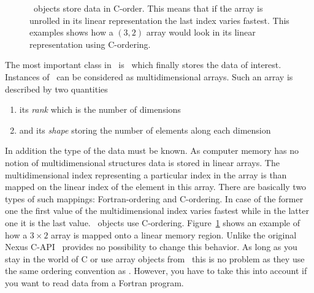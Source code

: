 \begin{figure}[tb]
\centering
\begin{minipage}[c]{0.3\linewidth}
\centering
{}
\end{minipage}
\hfill
\begin{minipage}[c]{0.68\linewidth}
\caption{{\small\label{fig:c_order}
\nxfield\ objects store data in C-order. This means that if the array is
unrolled in its linear representation the last index varies fastest. 
This examples shows how a $(3,2)$ array would look in its linear representation
using C-ordering.  }}
\end{minipage}
\end{figure}
The most important class in \pninx\ is \nxfield\ which finally stores the data
of interest. Instances of \nxfield\ can be considered as multidimensional
arrays. Such an array is described by two quantities
\begin{enumerate}
\item its {\em rank} which is the number of dimensions
\item and its {\em shape} storing the number of elements along each
dimension
\end{enumerate}
In addition the type of the data must be known. As computer memory has no notion
of multidimensional structures data is stored in linear arrays. The
multidimensional index representing a particular index in the array is than
mapped on the linear index of the element in this array. There are basically two
types of such mappings: Fortran-ordering and C-ordering. In case of the former
one the first value of the multidimensional index varies fastest while in the
latter one it is the last value. \nxfield\ objects use C-ordering. 
Figure~\ref{fig:c_order} shows an example of how a $3\times 2$ array is mapped
onto a linear memory region. 
Unlike the original Nexus C-API \pninx\ provides no possibility to change this
behavior. As long as you stay in the world of C or  use array objects from
\pniutils\ this is no problem as they use the same ordering convention as
\pninx. However, you have to take this into account if you want to read data
from a Fortran program.

